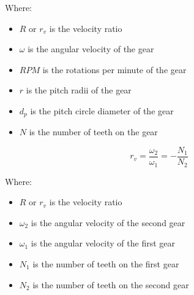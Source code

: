 \documentclass[11pt]{article}
\begin{document}
Where:
\begin{itemize}
\item \(R\) or \(r_v\) is the velocity ratio
\item \(\omega\) is the angular velocity of the gear
\item \(RPM\) is the rotations per minute of the gear
\item \(r\) is the pitch radii of the gear
\item \(d_{p}\) is the pitch circle diameter of the gear
\item \(N\) is the number of teeth on the gear
\end{itemize}

\[r_v = \frac{\omega_2}{\omega_1} = - \frac{N_1}{N_2}\]

Where:
\begin{itemize}
\item \(R\) or \(r_v\) is the velocity ratio
\item \(\omega_2\) is the angular velocity of the second gear
\item \(\omega_1\) is the angular velocity of the first gear
\item \(N_1\) is the number of teeth on the first gear
\item \(N_2\) is the number of teeth on the second gear
\end{itemize}
\end{document}
